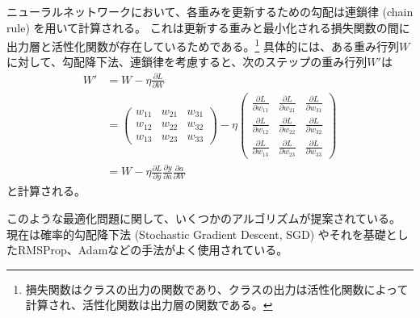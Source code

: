 ニューラルネットワークにおいて、各重みを更新するための勾配は連鎖律 (chain rule) を用いて計算される。
これは更新する重みと最小化される損失関数の間に出力層と活性化関数が存在しているためである。\footnote{損失関数はクラスの出力の関数であり、クラスの出力は活性化関数によって計算され、活性化関数は出力層の関数である。}
具体的には、ある重み行列$W$に対して、勾配降下法、連鎖律を考慮すると、次のステップの重み行列$W'$は
\begin{equation}
 \begin{split}
  W' &= W - \eta \frac{\partial L}{\partial W}\\
    &=
  \left(
    \begin{array}{ccc}
      w_{11} & w_{21} & w_{31} \\
      w_{12} & w_{22} & w_{32} \\
      w_{13} & w_{23} & w_{33}
    \end{array}
  \right)
  - \eta
  \left(
    \begin{array}{ccc}
      \frac{\partial L}{\partial w_{11}} & \frac{\partial L}{\partial w_{21}} & \frac{\partial L}{\partial w_{31}} \\
      \frac{\partial L}{\partial w_{12}} & \frac{\partial L}{\partial w_{22}} & \frac{\partial L}{\partial w_{32}} \\
      \frac{\partial L}{\partial w_{13}} & \frac{\partial L}{\partial w_{23}} & \frac{\partial L}{\partial w_{33}}
    \end{array}
  \right)\\
    &= W - \eta \frac{\partial L}{\partial y}\frac{\partial y}{\partial a}\frac{\partial a}{\partial W}
 \end{split}
\end{equation}
と計算される。

このような最適化問題に関して、いくつかのアルゴリズムが提案されている。
現在は確率的勾配降下法 (Stochastic Gradient Descent, SGD\cite{SGD}) やそれを基礎としたRMSProp\cite{RMSProp}、Adam\cite{Adam}などの手法がよく使用されている。

